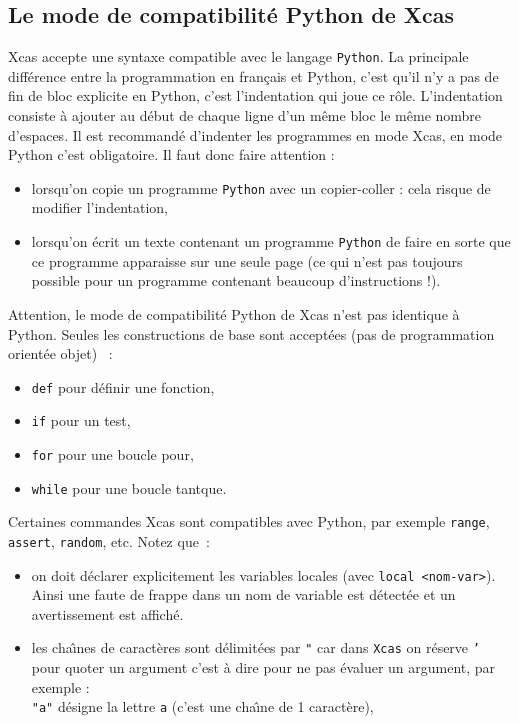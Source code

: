 \documentclass[12pt,a4paper]{book}
\begin{document}
\begin{giacjshere}
\section{Le mode de compatibilit\'e Python de Xcas} \label{sec:python}
Xcas accepte une syntaxe compatible avec le langage {\tt Python}. 
La principale diff\'erence entre la programmation en fran\c{c}ais
et Python, c'est qu'il n'y a
pas de fin de bloc explicite en Python, c'est l'indentation qui joue
ce r\^ole. L'indentation consiste \`a ajouter au d\'ebut de chaque 
ligne d'un m\^eme bloc le m\^eme nombre d’espaces.
Il est recommand\'e d'indenter les programmes en mode Xcas, en
mode Python c'est obligatoire.
Il faut donc faire attention :
\begin{itemize}
\item lorsqu'on copie un programme {\tt Python} avec un copier-coller : cela 
risque de modifier l'indentation,
\item lorsqu'on \'ecrit un texte contenant un programme {\tt Python}
de faire en sorte que ce programme apparaisse sur une seule page (ce qui n'est pas toujours possible pour un programme contenant beaucoup d'instructions !).
\end{itemize}
Attention, le mode de compatibilit\'e Python de Xcas n'est pas identique
\`a Python. Seules les constructions de base sont accept\'ees (pas de
programmation orient\'ee objet)~ :
\begin{itemize}
\item {\tt def} pour d\'efinir une fonction,
\item {\tt if} pour un test, 
\item {\tt for} pour une boucle pour, 
\item {\tt while} pour une boucle tantque.
\end{itemize}
Certaines commandes Xcas sont compatibles avec Python, par exemple
{\tt range}, {\tt assert}, {\tt random}, etc.
Notez que~:
\begin{itemize}
\item on doit d\'eclarer explicitement les variables
 locales (avec {\tt local <nom-var>}). 
 Ainsi une faute de frappe dans un nom de
 variable est d\'etect\'ee et
 un avertissement est affich\'e.
\item les cha\^{\i}nes de caract\`eres sont d\'elimit\'ees par {\tt "} car 
dans {\tt Xcas} on r\'eserve {\tt '} pour quoter un argument c'est \`a dire 
pour ne pas \'evaluer un argument, par exemple :\\
{\tt "a"} d\'esigne la lettre {\tt a} (c'est une cha\^{\i}ne de 1 caract\`ere),

\end{itemize}
\end{giacjshere}
\end{document}

